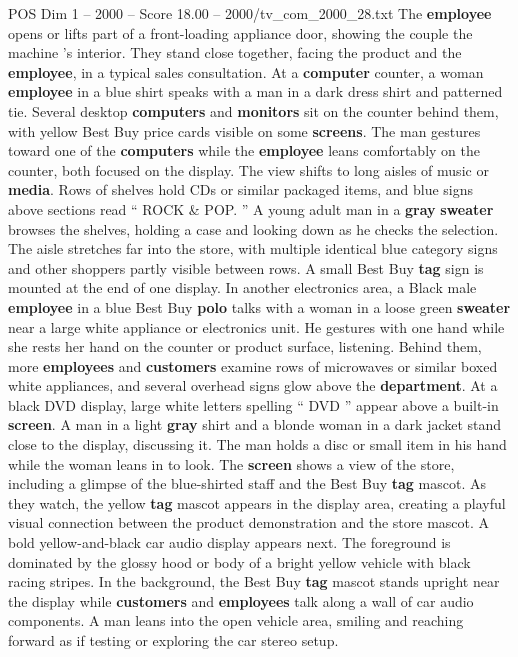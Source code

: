 \begin{textsample}{POS Dim 1 – 2000 – Score 18.00 – 2000/tv\_com\_2000\_28.txt}
The \textbf{employee} opens or lifts part of a front-loading appliance door, showing the couple the machine ’s interior.
They stand close together, facing the product and the \textbf{employee}, in a typical sales consultation.
At a \textbf{computer} counter, a woman \textbf{employee} in a blue shirt speaks with a man in a dark dress shirt and patterned tie.
Several desktop \textbf{computers} and \textbf{monitors} sit on the counter behind them, with yellow Best Buy price cards visible on some \textbf{screens}.
The man gestures toward one of the \textbf{computers} while the \textbf{employee} leans comfortably on the counter, both focused on the display.
The view shifts to long aisles of music or \textbf{media}.
Rows of shelves hold CDs or similar packaged items, and blue signs above sections read “ ROCK \& POP. ” A young adult man in a \textbf{gray} \textbf{sweater} browses the shelves, holding a case and looking down as he checks the selection.
The aisle stretches far into the store, with multiple identical blue category signs and other shoppers partly visible between rows.
A small Best Buy \textbf{tag} sign is mounted at the end of one display.
In another electronics area, a Black male \textbf{employee} in a blue Best Buy \textbf{polo} talks with a woman in a loose green \textbf{sweater} near a large white appliance or electronics unit.
He gestures with one hand while she rests her hand on the counter or product surface, listening.
Behind them, more \textbf{employees} and \textbf{customers} examine rows of microwaves or similar boxed white appliances, and several overhead signs glow above the \textbf{department}.
At a black DVD display, large white letters spelling “ DVD ” appear above a built-in \textbf{screen}.
A man in a light \textbf{gray} shirt and a blonde woman in a dark jacket stand close to the display, discussing it.
The man holds a disc or small item in his hand while the woman leans in to look.
The \textbf{screen} shows a view of the store, including a glimpse of the blue-shirted staff and the Best Buy \textbf{tag} mascot.
As they watch, the yellow \textbf{tag} mascot appears in the display area, creating a playful visual connection between the product demonstration and the store mascot.
A bold yellow-and-black car audio display appears next.
The foreground is dominated by the glossy hood or body of a bright yellow vehicle with black racing stripes.
In the background, the Best Buy \textbf{tag} mascot stands upright near the display while \textbf{customers} and \textbf{employees} talk along a wall of car audio components.
A man leans into the open vehicle area, smiling and reaching forward as if testing or exploring the car stereo setup.

\end{textsample}
